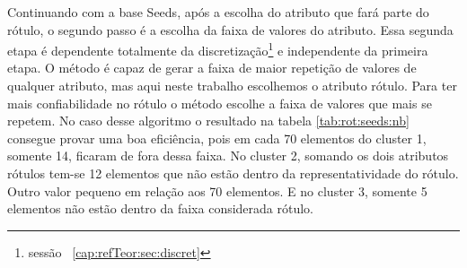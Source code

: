Continuando com a base Seeds, após a escolha do atributo que fará parte do rótulo, o segundo passo é a escolha da faixa de valores do atributo. Essa segunda etapa é dependente totalmente da discretização\footnote{sessão ~\ref{cap:refTeor:sec:discret}} e independente da primeira etapa. O método é capaz de gerar a faixa de maior repetição de valores de qualquer atributo, mas aqui neste trabalho escolhemos o atributo rótulo. Para ter mais  confiabilidade  no rótulo o método escolhe a faixa de valores que mais se repetem. No caso desse algoritmo o resultado na tabela \ref{tab:rot:seeds:nb} consegue provar uma boa eficiência, pois em cada 70 elementos do cluster 1, somente 14, ficaram de fora dessa faixa. No cluster 2, somando os dois atributos rótulos tem-se 12 elementos que não estão dentro da representatividade do rótulo. Outro valor pequeno em relação aos 70 elementos. E no cluster 3, somente 5 elementos não estão dentro da faixa considerada rótulo.


